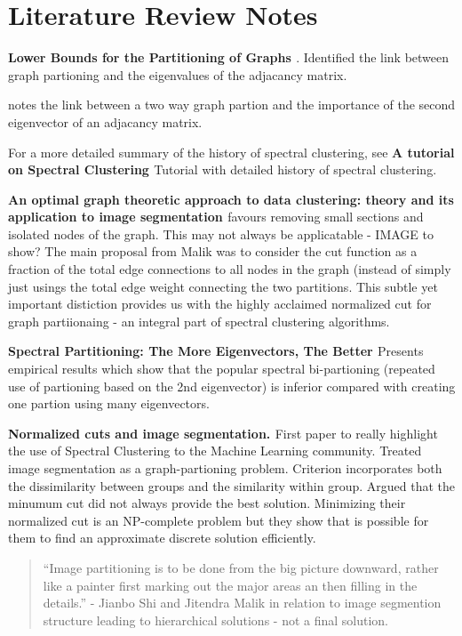 \documentclass[10pt]{report}
\begin{document}
\setpagewiselinenumbers
\linenumbers
\graphicspath{{Chapter3/figures/}}


\section{Literature Review Notes }


 \textbf{Lower Bounds for the Partitioning of Graphs \citep{Donath1973}}. Identified the link between graph partioning and the eigenvalues of the adjacancy matrix.

  \textbf{\citep{Fielder1973}} notes the link between a two way graph partion and the importance of the second eigenvector of an adjacancy matrix. 

For a more detailed summary of the history of spectral clustering, see \textbf{A tutorial on Spectral Clustering \citep{Luxburg2008}} Tutorial with detailed history of spectral clustering.  

\textbf{An optimal graph theoretic approach to data clustering: theory and its application to image segmentation \citep{Wu1993}} favours removing small sections and isolated nodes of the graph. This may not always be applicatable - IMAGE to show? The main proposal from Malik was to consider the cut function as a fraction of the total edge connections to all nodes in the graph (instead of simply just usings the total edge weight connecting the two partitions. This subtle yet important distiction provides us with the highly acclaimed normalized cut for graph partiionaing - an integral part of spectral clustering algorithms.  

\textbf{Spectral Partitioning: The More Eigenvectors, The Better \citep{Alpert1995}} Presents  empirical results which show that the popular spectral bi-partioning (repeated use of partioning based on the 2nd eigenvector) is inferior compared with creating one partion using many eigenvectors. 

\textbf{Normalized cuts and image segmentation. \citep{Malik2000}} First paper to really highlight the use of Spectral Clustering to the Machine Learning community. Treated image segmentation as a graph-partioning problem. Criterion incorporates both the dissimilarity between groups and the similarity within group. Argued that the minumum cut  did not always provide the best solution. Minimizing their normalized cut is an NP-complete problem but they show that is possible for them to find an approximate discrete solution efficiently. 
\begin{quote}
``Image partitioning is to be done from the big picture downward, rather like a painter first marking out the major areas an then filling in the details.'' - Jianbo Shi and Jitendra Malik in relation to image segmention structure leading to hierarchical solutions - not a final solution.
\end{quote}
\end{document}
